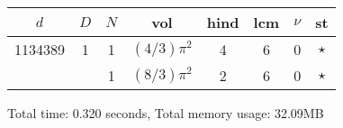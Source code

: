 \begin{tabular}{ccc|ccccc}
$d$ & $D$ & $N$ & vol & hind & lcm & $\nu$ & st\\
\hline
1134389 & 1 & 1 & $(4/3)\pi^2$ & 4 & 6 & 0 & $\star$ \\
 &  & 1 & $(8/3)\pi^2$ & 2 & 6 & 0 & $\star$ \\
\end{tabular}
Total time: 0.320 seconds, Total memory usage: 32.09MB
